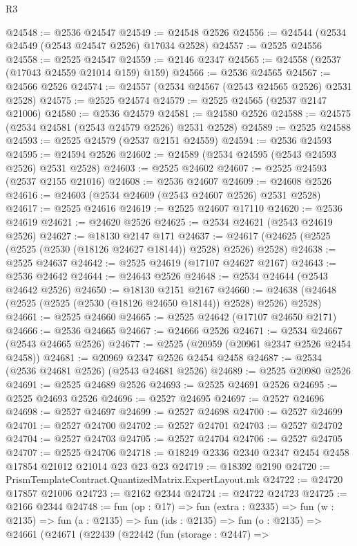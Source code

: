 \begin{lexlean}{R3}
\begin{coremodule}
@24548 := @2536 @24547
@24549 := @24548 @2526
@24556 := @24544 (@2534 @24549 (@2543 @24547 @2526) @17034 @2528)
@24557 := @2525 @24556
@24558 := @2525 @24547
@24559 := @2146 @2347
@24565 := @24558 (@2537 (@17043 @24559 @21014 @159) @159)
@24566 := @2536 @24565
@24567 := @24566 @2526
@24574 := @24557 (@2534 @24567 (@2543 @24565 @2526) @2531 @2528)
@24575 := @2525 @24574
@24579 := @2525 @24565 (@2537 @2147 @21006)
@24580 := @2536 @24579
@24581 := @24580 @2526
@24588 := @24575 (@2534 @24581 (@2543 @24579 @2526) @2531 @2528)
@24589 := @2525 @24588
@24593 := @2525 @24579 (@2537 @2151 @24559)
@24594 := @2536 @24593
@24595 := @24594 @2526
@24602 := @24589 (@2534 @24595 (@2543 @24593 @2526) @2531 @2528)
@24603 := @2525 @24602
@24607 := @2525 @24593 (@2537 @2155 @21016)
@24608 := @2536 @24607
@24609 := @24608 @2526
@24616 := @24603 (@2534 @24609 (@2543 @24607 @2526) @2531 @2528)
@24617 := @2525 @24616
@24619 := @2525 @24607 @17110
@24620 := @2536 @24619
@24621 := @24620 @2526
@24625 := @2534 @24621 (@2543 @24619 @2526)
@24627 := @18130 @2147 @171
@24637 := @24617 (@24625 (@2525 (@2525 (@2530 (@18126 @24627 @18144)) @2528) @2526) @2528)
@24638 := @2525 @24637
@24642 := @2525 @24619 (@17107 @24627 @2167)
@24643 := @2536 @24642
@24644 := @24643 @2526
@24648 := @2534 @24644 (@2543 @24642 @2526)
@24650 := @18130 @2151 @2167
@24660 := @24638 (@24648 (@2525 (@2525 (@2530 (@18126 @24650 @18144)) @2528) @2526) @2528)
@24661 := @2525 @24660
@24665 := @2525 @24642 (@17107 @24650 @2171)
@24666 := @2536 @24665
@24667 := @24666 @2526
@24671 := @2534 @24667 (@2543 @24665 @2526)
@24677 := @2525 (@20959 (@20961 @2347 @2526 @2454 @2458))
@24681 := @20969 @2347 @2526 @2454 @2458
@24687 := @2534 (@2536 @24681 @2526) (@2543 @24681 @2526)
@24689 := @2525 @20980 @2526
@24691 := @2525 @24689 @2526
@24693 := @2525 @24691 @2526
@24695 := @2525 @24693 @2526
@24696 := @2527 @24695
@24697 := @2527 @24696
@24698 := @2527 @24697
@24699 := @2527 @24698
@24700 := @2527 @24699
@24701 := @2527 @24700
@24702 := @2527 @24701
@24703 := @2527 @24702
@24704 := @2527 @24703
@24705 := @2527 @24704
@24706 := @2527 @24705
@24707 := @2525 @24706
@24718 := @18249 @2336 @2340 @2347 @2454 @2458 @17854 @21012 @21014 @23 @23 @23
@24719 := @18392 @2190
@24720 := PrismTemplateContract.QuantizedMatrix.ExpertLayout.mk
@24722 := @24720 @17857 @21006
@24723 := @2162 @2344
@24724 := @24722 @24723
@24725 := @2166 @2344
@24748 := fun (op : @17) =>
  fun (extra : @2335) =>
  fun (w : @2135) =>
  fun (a : @2135) =>
  fun (ids : @2135) =>
  fun (o : @2135) =>
  @24661
    (@24671
      (@22439
        (@22442
          (fun (storage : @2447) =>

\end{coremodule}
\end{lexlean}

